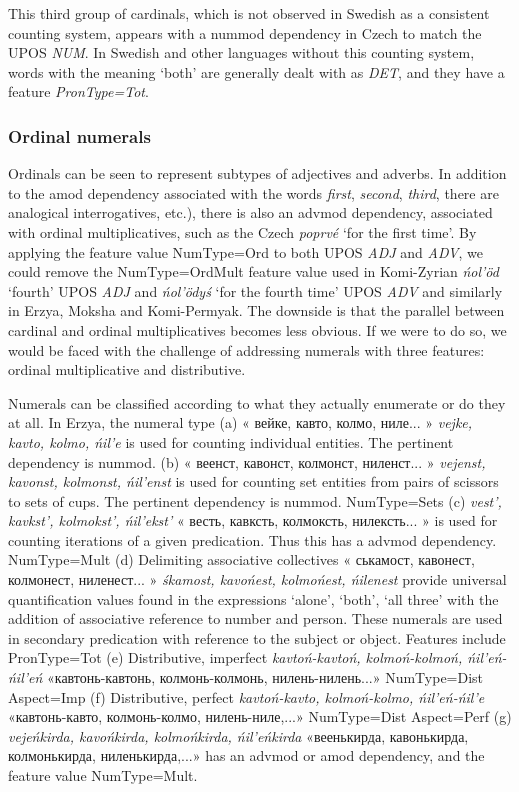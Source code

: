 \documentclass[free]{flammie}
\begin{document}
This third group of cardinals, which is not observed in Swedish as a consistent
counting system, appears with a nummod dependency in Czech to match the UPOS
\textit{NUM}. In Swedish and other languages without this counting system, words
with the meaning `both' are generally dealt with as \textit{DET}, and they have
a feature \textit{PronType=Tot}.

\subsubsection{Ordinal numerals}

Ordinals can be seen to represent subtypes of adjectives and adverbs. In
addition to the amod dependency associated with the words \textit{first},
\textit{second}, \textit{third}, there are analogical interrogatives, etc.),
there is also an advmod dependency, associated with ordinal multiplicatives,
such as the Czech \textit{poprvé} `for the first time'.  By applying the feature
value NumType=Ord to both UPOS \textit{ADJ} and \textit{ADV}, we could remove
the NumType=OrdMult feature value used in Komi-Zyrian \textit{ńol'öd} `fourth'
UPOS \textit{ADJ} and \textit{ńol'ödyś} `for the fourth time' UPOS \textit{ADV}
and similarly in Erzya, Moksha and Komi-Permyak. The downside is that the
parallel between cardinal and ordinal multiplicatives becomes less obvious. If
we were to do so, we would be faced with the challenge of addressing numerals
with three features: ordinal multiplicative and distributive.

Numerals can be classified according to what they actually enumerate or do they
at all.  In Erzya, the numeral type (a) « вейке, кавто, колмо,
ниле... » \textit{vejke, kavto, kolmo, ńil'e} is used for counting
individual entities. The pertinent dependency is nummod.  (b) «
веенст, кавонст, колмонст, ниленст... » \textit{vejenst, kavonst,
kolmonst, ńil'enst} is used for counting set entities from pairs of scissors to
sets of cups. The pertinent dependency is nummod. NumType=Sets (c)
\textit{vest', kavkst', kolmokst', ńil'ekst'} « весть, кавксть,
колмоксть, нилексть... » is used for counting iterations of a
given predication. Thus this has a advmod dependency. NumType=Mult (d)
Delimiting associative collectives « ськамост, кавонест, колмонест,
ниленест... » \textit{śkamost, kavońest, kolmońest, ńilenest}
provide universal quantification values found in the expressions `alone',
`both', `all three' with the addition of associative reference to number and
person. These numerals are used in secondary predication with reference to the
subject or object. Features include PronType=Tot (e) Distributive, imperfect
\textit{kavtoń-kavtoń, kolmoń-kolmoń, ńil'eń-ńil'eń} «кавтонь-кавтонь,
колмонь-колмонь, нилень-нилень...» NumType=Dist Aspect=Imp (f) Distributive,
perfect \textit{kavtoń-kavto, kolmoń-kolmo, ńil'eń-ńil'e} «кавтонь-кавто,
колмонь-колмо, нилень-ниле,...» NumType=Dist Aspect=Perf (g) \textit{vejeńkirda,
kavońkirda, kolmońkirda, ńil'eńkirda} «веенькирда, кавонькирда, колмонькирда,
ниленькирда,...» has an advmod or amod dependency, and the feature value
NumType=Mult.
\end{document}
